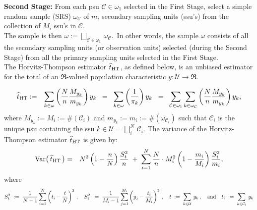 \documentclass{article}
\begin{document}
\noindent
\textbf{Second Stage:} \; From each psu $\mathcal{C} \in \omega_{1}$ selected in the First Stage, select a simple random sample (SRS) $\omega_{\mathcal{C}}$ of $m_{i}$ secondary sampling units (ssu's) from the collection of $M_{i}$ ssu's in $\mathcal{C}$. \\

\noindent
The sample is then $\omega := \displaystyle{\bigsqcup_{\mathcal{C}\in\omega_{1}}}\,\omega_{\mathcal{C}}$. \,In other words, the sample $\omega$ consists of all the secondary sampling units (or observation units) selected (during the Second Stage) from all the primary sampling units selected in the First Stage. \\

\noindent
The Horvitz-Thompson estimator $\widehat{t}_{\textnormal{HT}}$, as defined below, is an unbiased estimator for the total of an $\Re$-valued population characteristic $y : \mathcal{U} \longrightarrow \Re$.

\begin{eqnarray*}
\widehat{t}_{\textnormal{HT}}
& := & \sum_{k\in\omega}\left(\dfrac{N}{n}\dfrac{M_{y_{k}}}{m_{y_{k}}}\right)y_{k}
\;\;=\;\; \sum_{k\in\omega}\left(\dfrac{1}{\pi_{k}}\right)y_{k}
\;\;=\;\; \sum_{\mathcal{C}\in\omega_{1}} \sum_{k\in\omega_{\mathcal{C}}}\left(\dfrac{N}{n}\dfrac{M_{y_{k}}}{m_{y_{k}}}\right)y_{k},
\end{eqnarray*}
where $M_{y_{k}} := M_{i} := \#(\mathcal{C}_{i})$ and $m_{y_{k}} := m_{i} := \#(\omega_{\mathcal{C}_{i}})$ such that $\mathcal{C}_{i}$ is the unique psu containing the ssu $k \in \mathcal{U} = \displaystyle{\bigsqcup_{i}^{N}}\,\mathcal{C}_{i}$.  The variance of the Horvitz-Thompson estimator $\widehat{t}_{\textnormal{HT}}$ is given by:
\begin{eqnarray*}
\textnormal{Var}\!\left(\,\widehat{t}_{\textnormal{HT}}\,\right)
& = & N^{2}\left(1-\dfrac{n}{N}\right)\dfrac{S^{2}_{t}}{n} \; + \; 
\sum^{N}_{i=1}\dfrac{N}{n}\cdot M_{i}^{2}\left(1-\dfrac{m_{i}}{M_{i}}\right)\dfrac{S^{2}_{i}}{m_{i}},
\end{eqnarray*}
where
\begin{equation*}
S_{t}^{2} \; := \; \dfrac{1}{N-1}\sum^{N}_{i=1}\left(t_{i}-\dfrac{t}{N}\right)^{2}
\,,\quad
S_{i}^{2} \; := \; \dfrac{1}{M_{i}-1}\sum^{M_{i}}_{j=1}\left(y_{j}-\dfrac{t_{i}}{M_{i}}\right)^{2}
\,,\quad
t \; := \; \sum_{k\in\mathcal{U}}\,y_{k}
\,,\quad\textnormal{and}\quad
t_{i} \; := \; \sum_{k\in\mathcal{C}_{i}}\,y_{k}
\end{equation*}
\end{document}
